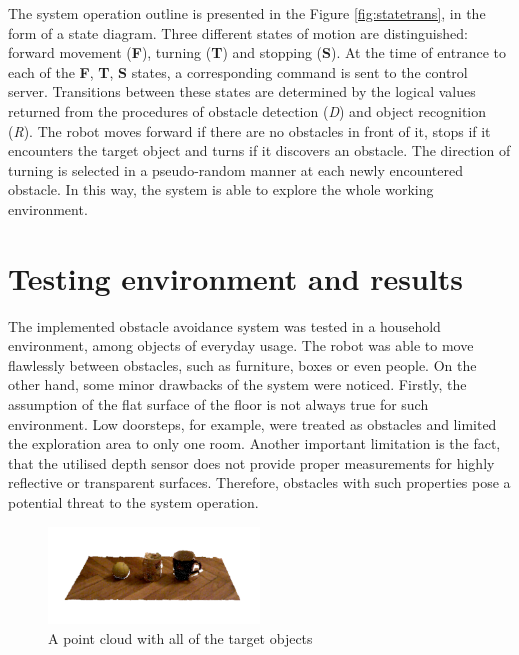 The system operation outline is presented in the Figure \ref{fig:statetrans}, in the form of a state diagram. Three different states of motion are distinguished: forward movement (\textbf{F}), turning (\textbf{T}) and stopping (\textbf{S}). 
At the time of entrance to each of the \textbf{F}, \textbf{T}, \textbf{S} states, a corresponding command is sent to the control server. Transitions between these states are determined by the logical values returned from the procedures of obstacle detection (\textit{D}) and object recognition (\textit{R}). The robot moves forward if there are no obstacles in front of it, stops if it encounters the target object and turns if it discovers an obstacle. The direction of turning is selected in a pseudo-random manner at each newly encountered obstacle. In this way, the system is able to explore the whole working environment. 


\section{Testing environment and results}
\label{sec:testing}


The implemented obstacle avoidance system was tested in a household environment, among objects of everyday usage. The robot was able to move flawlessly between obstacles, such as furniture, boxes or even people. On the other hand, some minor drawbacks of the system were noticed. Firstly, the assumption of the flat surface of the floor is not always true for such environment. Low doorsteps, for example, were treated as obstacles and limited the exploration area to only one room. Another important limitation is the fact, that the utilised depth sensor does not provide proper measurements for highly reflective or transparent surfaces. Therefore, obstacles with such properties pose a potential threat to the system operation.

\begin{figure}[H]
\centering
\includegraphics[width=0.5\textwidth]{fig/targetswhite}
\caption{A point cloud with all of the target objects}
\label{fig:targets}
\end{figure}

